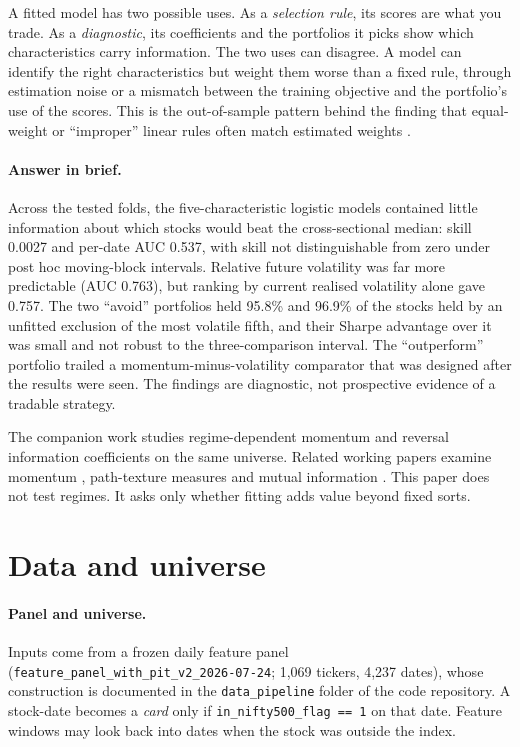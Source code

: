 \documentclass[11pt]{article}
\begin{document}
A fitted model has two possible uses. As a \emph{selection rule}, its scores are what you trade. As a \emph{diagnostic}, its coefficients and the portfolios it picks show which characteristics carry information. The two uses can disagree. A model can identify the right characteristics but weight them worse than a fixed rule, through estimation noise or a mismatch between the training objective and the portfolio's use of the scores. This is the out-of-sample pattern behind the finding that equal-weight or ``improper'' linear rules often match estimated weights \citep{dawes1979,demiguel2009}.

\paragraph{Answer in brief.} Across the tested folds, the five-characteristic logistic models contained little information about which stocks would beat the cross-sectional median: skill 0.0027 and per-date AUC 0.537, with skill not distinguishable from zero under post hoc moving-block intervals. Relative future volatility was far more predictable (AUC 0.763), but ranking by current realised volatility alone gave 0.757. The two ``avoid'' portfolios held 95.8\% and 96.9\% of the stocks held by an unfitted exclusion of the most volatile fifth, and their Sharpe advantage over it was small and not robust to the three-comparison interval. The ``outperform'' portfolio trailed a momentum-minus-volatility comparator that was designed after the results were seen. The findings are diagnostic, not prospective evidence of a tradable strategy.

The companion work \citep{sahi_irfa} studies regime-dependent momentum and reversal information coefficients on the same universe. Related working papers examine momentum \citep{sahi_momentum}, path-texture measures \citep{sahi_pathtexture} and mutual information \citep{sahi_mi}. This paper does not test regimes. It asks only whether fitting adds value beyond fixed sorts.

\section{Data and universe}
\label{sec:data}

\paragraph{Panel and universe.} Inputs come from a frozen daily feature panel (\nolinkurl{feature_panel_with_pit_v2_2026-07-24}; 1,069 tickers, 4,237 dates), whose construction is documented in the \texttt{data\_pipeline} folder of the code repository. A stock-date becomes a \emph{card} only if \texttt{in\_nifty500\_flag == 1} on that date. Feature windows may look back into dates when the stock was outside the index.
\end{document}
